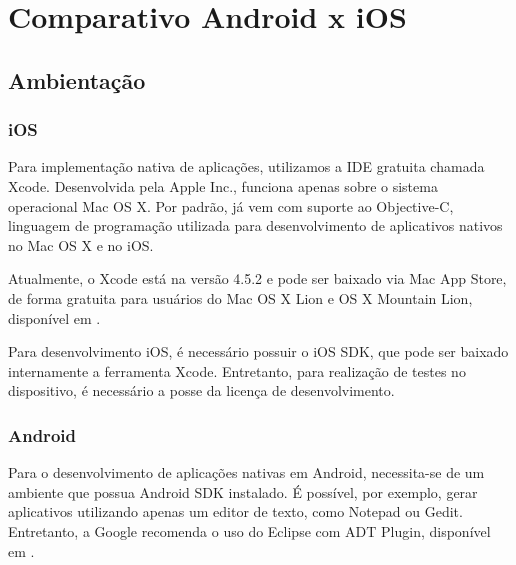     \chapter{Comparativo Android x iOS} \label{CHP:COMP}%
    \section {Ambientação}
     
    \subsection{iOS}
    
	Para implementação nativa de aplicações, utilizamos a \ac{IDE} gratuita chamada Xcode. Desenvolvida pela Apple Inc., funciona apenas sobre o sistema operacional Mac OS X.  Por padrão, já vem com suporte ao Objective-C, linguagem de programação utilizada para desenvolvimento de aplicativos nativos no Mac OS X e no iOS.
    
	Atualmente, o Xcode está na versão 4.5.2 e pode ser baixado via Mac App Store, de forma gratuita para usuários do Mac OS X Lion e OS X Mountain Lion, disponível em \cite{xcode}.
    
	Para desenvolvimento iOS, é necessário possuir o iOS SDK, que pode ser baixado internamente a ferramenta Xcode. Entretanto, para realização de testes no dispositivo, é necessário a posse da licença de desenvolvimento.
     
    \subsection{Android}
           
		    Para o desenvolvimento de aplicações nativas em Android, necessita-se de um ambiente que possua Android SDK instalado. É possível, por exemplo, gerar aplicativos utilizando apenas um editor de texto, como Notepad ou Gedit. Entretanto, a Google recomenda o uso do Eclipse com ADT Plugin, disponível em \cite{adt}.
           
     
     
